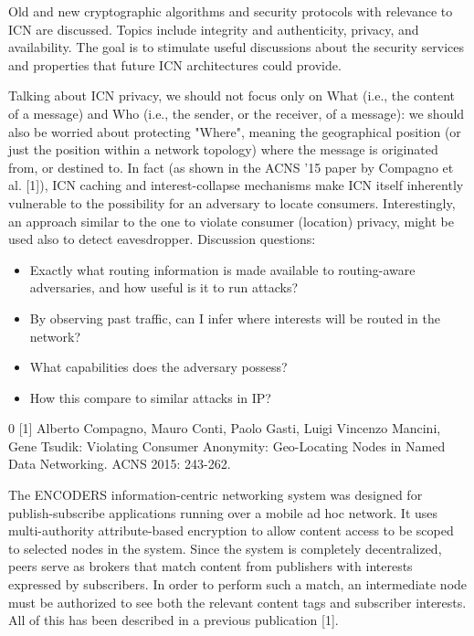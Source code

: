 \documentclass[a4paper,UKenglish]{dagrep}
\begin{document}
Old and new cryptographic algorithms and security protocols with relevance to ICN are discussed. Topics include integrity and authenticity, privacy, and availability. The goal is to stimulate useful discussions about the security services and properties that future ICN architectures could provide.

\license

Talking about ICN privacy, we should not focus only on What (i.e., the content of a message) and Who (i.e., the sender, or the receiver, of a message): we should also be worried about protecting "Where", meaning the geographical position (or just the position within a network topology) where the message is originated from, or destined to. In fact (as shown in the ACNS '15 paper by Compagno et al. [1]), ICN caching and interest-collapse mechanisms make ICN itself inherently vulnerable to the possibility for an adversary to locate consumers.
Interestingly, an approach similar to the one to violate consumer (location) privacy, might be used also to detect eavesdropper.
Discussion questions:
\begin{itemize}
\item Exactly what routing information is made available to routing-aware adversaries, and  how useful is it to run attacks?
\item By observing past traffic, can I infer where interests will be routed in the network?
\item What capabilities does the adversary possess?
\item How this compare to similar attacks in IP?
\end{itemize}

\begin{thebibliography}{0}
[1] Alberto Compagno, Mauro Conti, Paolo Gasti, Luigi Vincenzo Mancini, Gene Tsudik:
Violating Consumer Anonymity: Geo-Locating Nodes in Named Data Networking. ACNS 2015: 243-262.
\end{thebibliography}

\license

The ENCODERS information-centric networking system was designed for publish-subscribe applications running over a mobile ad hoc network. It uses multi-authority attribute-based encryption to allow content access to be scoped to selected nodes in the system. Since the system is completely decentralized, peers serve as brokers that match content from publishers with interests expressed by subscribers. In order to perform such a match, an intermediate node must be authorized to see both the relevant content tags and  subscriber interests. All of this has been described in a previous publication [1].
\end{document}
